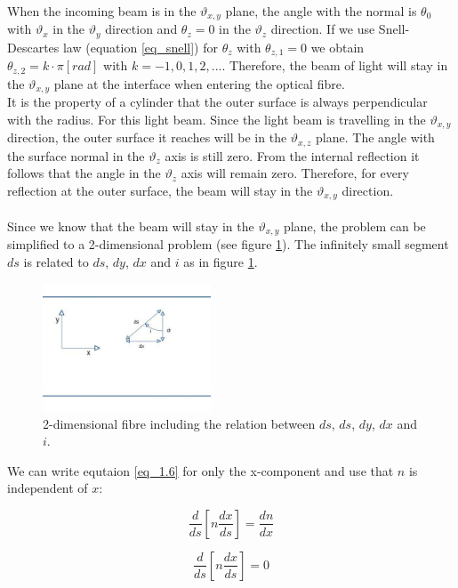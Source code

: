 \documentclass{article}
\begin{document}
When the incoming beam is in the $\vartheta _{x,y}$ plane, the angle with the normal is $\theta _0$ with $\vartheta _x$ in the $\vartheta _y$ direction and $\theta _z = 0$ in the $\vartheta _z$ direction. If we use Snell-Descartes law (equation \ref{eq_snell}) for $\theta _z$ with $\theta _{z,1} = 0$ we obtain $\theta _{z,2} = k \cdot \pi [rad]$ with $k = -1,0,1,2,...$. Therefore, the beam of light will stay in the $\vartheta _{x,y}$ plane at the interface when entering the optical fibre. \\
It is the property of a cylinder that the outer surface is always perpendicular with the radius. For this light beam. Since the light beam is travelling in the $\vartheta _{x,y}$ direction, the outer surface it reaches will be in the $\vartheta _{x,z}$ plane. The angle with the surface normal in the $\vartheta _z$ axis is still zero. From the internal reflection it follows that the angle in  the $\vartheta _z$ axis will remain zero. Therefore, for every reflection at the outer surface, the beam will stay in the $\vartheta _{x,y}$ direction.\\
\\ 
Since we know that the beam will stay in the $\vartheta _{x,y}$ plane, the problem can  be simplified to a 2-dimensional problem (see figure \ref{fig_fibre_2d}). The infinitely small segment $ds$ is related to $ds$, $dy$, $dx$ and $i$ as in figure \ref{fig_fibre_2d}. 

\begin{figure}[h!]
	\centering
	\includegraphics[width = 5cm]{afbeeldingen/fibre_2d.jpg}
	\caption{2-dimensional fibre including the relation between $ds$, $ds$, $dy$, $dx$ and $i$.}
	\label{fig_fibre_2d}
\end{figure}

We can write equtaion \ref{eq_1.6} for only the x-component and use that $n$ is independent of $x$:

\begin{equation}
	\frac{d}{ds} \left[ n \frac{d x}{ds} \right] = \frac{d n}{dx}
\end{equation}

\begin{equation}
	\frac{d}{ds} \left[ n \frac{d x}{ds} \right] = 0
\end{equation}
\end{document}
